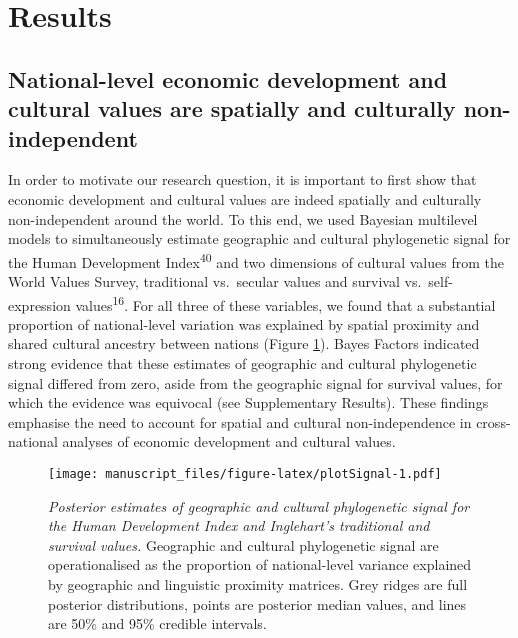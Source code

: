 \documentclass[
  english,
  man,floatsintext]{apa6}
\begin{document}
\hypertarget{results}{%
\section{Results}\label{results}}

\hypertarget{national-level-economic-development-and-cultural-values-are-spatially-and-culturally-non-independent}{%
\subsection{National-level economic development and cultural values are spatially and culturally non-independent}\label{national-level-economic-development-and-cultural-values-are-spatially-and-culturally-non-independent}}

In order to motivate our research question, it is important to first show that economic development and cultural values are indeed spatially and culturally non-independent around the world. To this end, we used Bayesian multilevel models to simultaneously estimate geographic and cultural phylogenetic signal for the Human Development Index\textsuperscript{40} and two dimensions of cultural values from the World Values Survey, traditional vs.~secular values and survival vs.~self-expression values\textsuperscript{16}. For all three of these variables, we found that a substantial proportion of national-level variation was explained by spatial proximity and shared cultural ancestry between nations (Figure \ref{fig:plotSignal}). Bayes Factors indicated strong evidence that these estimates of geographic and cultural phylogenetic signal differed from zero, aside from the geographic signal for survival values, for which the evidence was equivocal (see Supplementary Results). These findings emphasise the need to account for spatial and cultural non-independence in cross-national analyses of economic development and cultural values.



\begin{figure}
\centering
\texttt{[image: manuscript\_files/figure-latex/plotSignal-1.pdf]}
\caption{\label{fig:plotSignal}\emph{Posterior estimates of geographic and cultural phylogenetic signal for the Human Development Index and Inglehart's traditional and survival values.} Geographic and cultural phylogenetic signal are operationalised as the proportion of national-level variance explained by geographic and linguistic proximity matrices. Grey ridges are full posterior distributions, points are posterior median values, and lines are 50\% and 95\% credible intervals.}
\end{figure}
\end{document}
